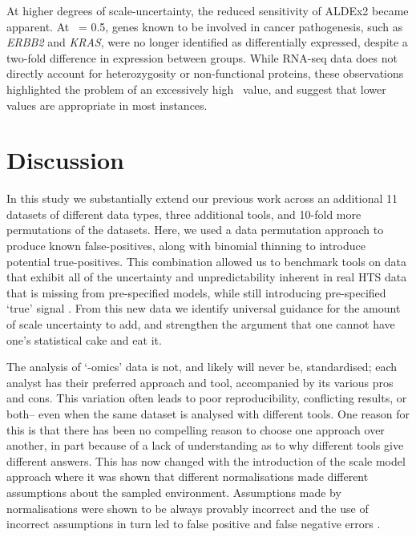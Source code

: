 \documentclass[10pt,letterpaper]{article}
\begin{document}
At higher degrees of scale-uncertainty, the reduced sensitivity of ALDEx2 became apparent. At \textgamma~= 0.5, genes known to be involved in cancer pathogenesis, such as \textit{ERBB2} and \textit{KRAS}, were no longer identified as differentially expressed, despite a two-fold difference in expression between groups. While RNA-seq data does not directly account for heterozygosity or non-functional proteins, these observations highlighted the problem of an excessively high \textgamma~value, and suggest that lower values are appropriate in most instances.


\section*{Discussion}

In this study we substantially extend our previous work across an additional 11 datasets of different data types, three additional tools, and 10-fold more permutations of the datasets. Here, we used a data permutation approach \cite{li_exaggerated_2022} to produce known false-positives, along with binomial thinning \cite{gerard_data-based_2020} to introduce potential true-positives. This combination allowed us to benchmark tools on data that exhibit all of the uncertainty and unpredictability inherent in real HTS data that is missing from pre-specified models, while still introducing pre-specified `true' signal \cite{gerard_data-based_2020}. From this new data we identify universal guidance for the amount of scale uncertainty to add, and strengthen the argument that one cannot have one's statistical cake and eat it. 

The analysis of `-omics' data is not, and likely will never be, standardised; each analyst has their preferred approach and tool, accompanied by its various pros and cons. This variation often leads to poor reproducibility, conflicting results, or both-- even when the same dataset is analysed with different tools. One reason for this is that there has been no compelling reason to choose one approach over another, in part because of a lack of understanding as to why different tools give different answers. This has now changed with the introduction of the scale model approach \cite{nixon_scale_2024} where it was shown that different normalisations made different assumptions about the sampled environment. Assumptions made by normalisations were shown to be always provably incorrect and the use of incorrect assumptions in turn led to false positive and false negative errors \cite{nixon_scale_2024, nixon_incorporating_2025, gloor_explicit_2025, mcgovern_replacing_2025}.
\end{document}
